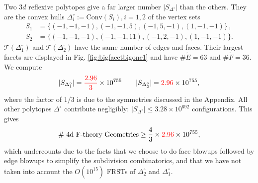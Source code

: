 \documentclass[aps,prl,twocolumn, superscriptaddress,groupedaddress,nofootinbib]{revtex4-1}
\newcommand{\sdoc}{S_{\Delta_1^\circ}}
\newcommand{\sdtc}{S_{\Delta_2^\circ}}
\newcommand{\doc}{{\Delta_1^\circ}}
\newcommand{\dtc}{{\Delta_2^\circ}}
\begin{document}
Two $3d$ reflexive polytopes give a far larger number $|S_{\Delta^\circ}|$
than the others. They
are  the convex hulls $\Delta_i^\circ := \text{Conv}(S_i), i=1,2$ of the
vertex sets
\begin{align} 
S_1 &= \{ (-1,-1,-1),(-1,-1,5),(-1,5,-1),(1,-1,-1)\}\, , \nonumber \\
S_2 &= \{ (-1,-1,-1),(-1,-1,11),(-1,2,-1),(1,-1,-1)\}. \nonumber
\end{align}
{\color{red}$\mathcal{T}(\doc)$ and $\mathcal{T}(\dtc)$} have the same number of edges and faces. 
Their largest facets are displayed in  Fig. \ref{fig:bigfacetbigone1} and have $\# \tilde E = 63$ and $\# \tilde F=36$. We compute
\begin{equation}
|\sdoc| = {\color{red}\frac{2.96}{3}} \times 10^{755} \qquad |\sdtc| = {\color{red}2.96} \times 10^{755},
\label{eqn:sdocsdtccounts}
\end{equation}
where the factor of $1/3$ is due to the symmetries discussed in the Appendix.
All other polytopes $\Delta^\circ$ contribute negligibly:
$|S_{\Delta^\circ}| \leq 3.28\times 10^{692}$ 
configurations. This gives
\begin{equation}
\text{\# 4d F-theory Geometries} \geq \frac43 \times {\color{red}2.96} \times 10^{755},
\end{equation}
which undercounts due to the facts that we choose to do face blowups followed by
edge blowups to simplify the subdivision combinatorics, and
that we have not taken into account the $O(10^{15})$ FRSTs of 
$\dtc$ and $\doc$. %

\vspace{.2cm}
\end{document}
